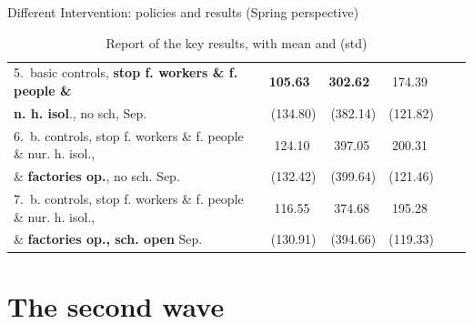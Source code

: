 \documentclass[8pt]{beamer}
\begin{document}
\begin{frame}{Different Intervention: policies and results (Spring perspective)}
\begin{table}[H]
\begin{tabular}{lrrrrr}
5.~basic controls, \textbf{stop f. workers \&  f. people \&}    & \textbf{{\color{orange}105.63}}~    &  \textbf{{\color{orange}302.62}}~      &  174.39~   \\
\textbf{ n. h. isol}., no sch, Sep.                                              &   (134.80)   &     (382.14)          &  (121.82) \\
 \midrule
6.~b. controls, stop f. workers \&  f. people \& nur. h. isol.,  &  124.10~    &    397.05~           &  200.31~    \\
\& \textbf{factories op.}, no sch. Sep.                                               &  (132.42)   &    (399.64)           &  (121.46) \\
\midrule
7.~b. controls, stop f. workers  \&  f. people \& nur. h. isol.,   &  116.55~   &    374.68~           &  195.28~    \\
 \& \textbf{factories op., sch. open} Sep.                                            &  (130.91) &     (394.66)           &  (119.33) \\
\bottomrule
\end{tabular}
\caption{Report of the key results, with mean and (std)}
\label{keyResultsT}
\end{table}



\end{frame}

\section{The second wave}
\end{document}
